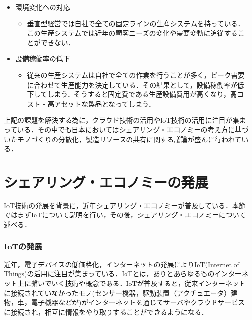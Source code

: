 \begin{itemize}
\tightlist
\item
  環境変化への対応

  \begin{itemize}
  \tightlist
  \item
    垂直型経営では自社で全ての固定ラインの生産システムを持っている．この生産システムでは近年の顧客ニーズの変化や需要変動に追従することができない．
  \end{itemize}
\item
  設備稼働率の低下

  \begin{itemize}
  \tightlist
  \item
    従来の生産システムは自社で全ての作業を行うことが多く，ピーク需要に合わせて生産能力を決定している．その結果として，設備稼働率が低下してしまう．そうすると固定費である生産設備費用が高くなり，高コスト・高アセットな製品となってしまう．
  \end{itemize}
\end{itemize}

上記の課題を解決する為に，クラウド技術の活用やIoT技術の活用に注目が集まっている．その中でも日本においてはシェアリング・エコノミーの考え方に基づいたモノづくりの分散化，製造リソースの共有に関する議論が盛んに行われている\cite{IVI}．

\hypertarget{ux30b7ux30a7ux30a2ux30eaux30f3ux30b0ux30a8ux30b3ux30ceux30dfux30fcux306eux767aux5c55}{%
\section{シェアリング・エコノミーの発展}\label{ux30b7ux30a7ux30a2ux30eaux30f3ux30b0ux30a8ux30b3ux30ceux30dfux30fcux306eux767aux5c55}}

IoT技術の発展を背景に，近年シェアリング・エコノミーが普及している．本節ではまずIoTについて説明を行い，その後，シェアリング・エコノミーについて述べる．

\hypertarget{iotux306eux767aux5c55}{%
\subsubsection{IoTの発展}\label{iotux306eux767aux5c55}}

近年，電子デバイスの低価格化，インターネットの発展によりIoT(Internet of
Things)の活用に注目が集まっている．IoTとは，ありとあらゆるものインターネット上に繋いでいく技術や概念である\cite{IoT2009}．IoTが普及すると，従来インターネットに接続されていなかったモノ(センサー機器，駆動装置（アクチュエータ）建物，車，電子機器などが)がインターネットを通じてサーバやクラウドサービスに接続され，相互に情報をやり取りすることができるようになる\cite{AWS-IoT}．

